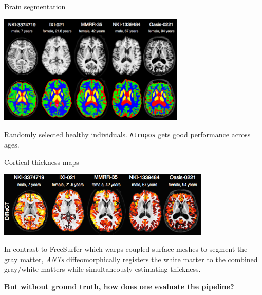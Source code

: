 \documentclass[ignorenonframetext,]{beamer}
\begin{document}
\begin{frame}[fragile]{Brain segmentation}

\begin{centering}

\includegraphics[width=3.5in]{./evaluation/figures/brainSegmentation.png}

\end{centering}

\small

Randomly selected healthy individuals. \texttt{Atropos} gets good
performance across ages.

\end{frame}

\begin{frame}{Cortical thickness maps}

\begin{centering}

\includegraphics[width=4in]{./evaluation/figures/corticalThicknessEstimation.png}

\end{centering}

\small

In contrast to FreeSurfer which warps coupled surface meshes to segment
the gray matter, \emph{ANTs} diffeomorphically registers the white
matter to the combined gray/white matters while simultaneously
estimating thickness.

\end{frame}

\begin{frame}

\begin{centering}

\Large

{\bf But without ground truth, how does one evaluate the pipeline?}

\end{centering}

\end{frame}
\end{document}
